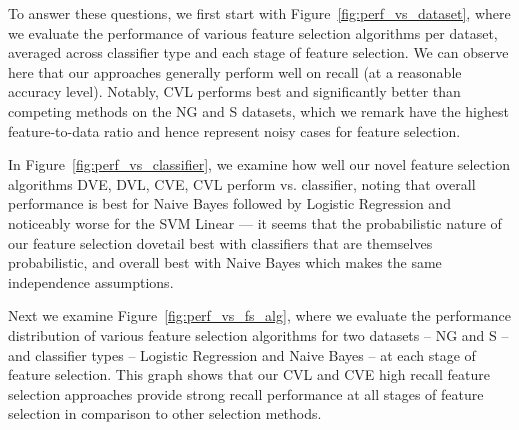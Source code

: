 To answer these questions, we first start with
Figure~\ref{fig:perf_vs_dataset}, where we evaluate the performance of
various feature selection algorithms per dataset, averaged across
classifier type and each stage of feature selection. We can observe
here that our approaches generally perform well on recall (at a
reasonable accuracy level).  Notably, CVL performs best and
significantly better than competing methods on the NG and S datasets,
which we remark have the highest feature-to-data ratio and hence 
represent noisy cases for feature selection.  


In Figure~\ref{fig:perf_vs_classifier}, we examine how well our 
novel feature selection algorithms DVE, DVL, CVE, CVL 
perform vs. classifier, noting that overall performance is best
for Naive Bayes followed by Logistic Regression and noticeably worse for
the SVM Linear --- it seems that the probabilistic nature of our feature selection
dovetail best with classifiers that are themselves probabilistic,
and overall best with Naive Bayes which makes the same independence assumptions.

Next we examine Figure~\ref{fig:perf_vs_fs_alg}, where we evaluate the
performance distribution of various feature selection algorithms for
two datasets -- NG and S -- and classifier types -- Logistic
Regression and Naive Bayes -- at each stage of feature selection.
This graph shows that our CVL and CVE high recall feature selection
approaches provide strong recall performance at all stages of
feature selection in comparison to other selection methods.

